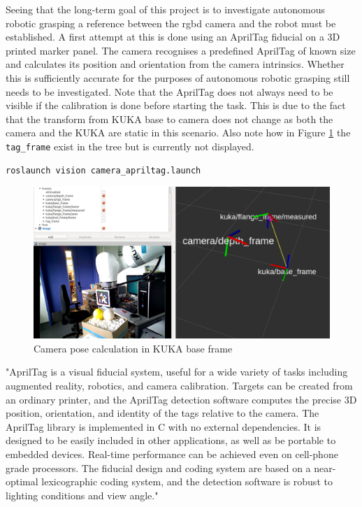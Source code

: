 \documentclass[headsepline,footinclude=false,fontsize=11pt,paper=a4,listof=totoc,bibliography=totoc,BCOR=12mm,DIV=14]{scrbook}
\begin{document}
Seeing that the long-term goal of this project is to investigate autonomous robotic grasping a reference between the \gls{rgbd} camera and the robot must be established. A first attempt at this is done using an AprilTag fiducial on a 3D printed marker panel. The camera recognises a predefined AprilTag of known size and calculates its position and orientation from the camera intrinsics. Whether this is sufficiently accurate for the purposes of autonomous robotic grasping still needs to be investigated. Note that the AprilTag does not always need to be visible if the calibration is done before starting the task. This is due to the fact that the transform from KUKA base to camera does not change as both the camera and the KUKA are static in this scenario. Also note how in Figure \ref{fig:camera_frames_rviz} the \texttt{tag\_frame} exist in the tree but is currently not displayed.

\begin{lstlisting}[language=bash, caption={Launching camera AprilTag node}]
roslaunch vision camera_apriltag.launch
\end{lstlisting}

\begin{figure}[h]
    \centering
    \includegraphics[width=\textwidth]{figures/camera_frames_rviz}
    \caption{Camera pose calculation in KUKA base frame}
    \label{fig:camera_frames_rviz}
\end{figure}

\newpage

"AprilTag is a visual fiducial system, useful for a wide variety of tasks including augmented reality, robotics, and camera calibration. Targets can be created from an ordinary printer, and the AprilTag detection software computes the precise 3D position, orientation, and identity of the tags relative to the camera. The AprilTag library is implemented in C with no external dependencies. It is designed to be easily included in other applications, as well as be portable to embedded devices. Real-time performance can be achieved even on cell-phone grade processors. The fiducial design and coding system are based on a near-optimal lexicographic coding system, and the detection software is robust to lighting conditions and view angle." \cite{AprilTag}
\end{document}
